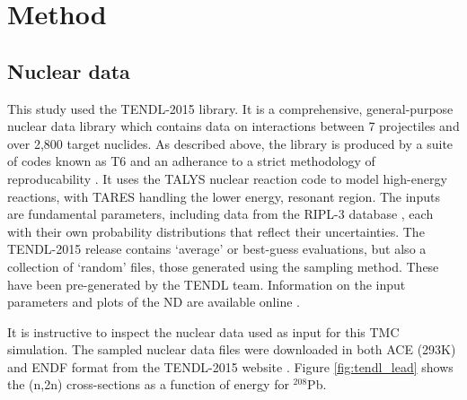 \FloatBarrier
\section{Method}

\subsection{Nuclear data}
\label{sec:data}
This study used the TENDL-2015 library. It is a comprehensive, general-purpose nuclear data library which contains data on interactions between 7 projectiles and over 2,800 target nuclides. As described above, the library is produced by a suite of codes known as T6 and an adherance to a strict methodology of reproducability \cite{Rochman2016}. It uses the TALYS nuclear reaction code to model high-energy reactions, with TARES handling the lower energy, resonant region. The inputs are fundamental parameters, including data from the RIPL-3 database \cite{RIPL3}, each with their own probability distributions that reflect their uncertainties. The TENDL-2015 release contains `average' or best-guess evaluations, but also a collection of `random' files, those generated using the sampling method. These have been pre-generated by the TENDL team. Information on the input parameters and plots of the ND are available online \cite{TENDL2015}.

It is instructive to inspect the nuclear data used as input for this TMC simulation. The sampled nuclear data files were downloaded in both ACE (293K) and ENDF format from the TENDL-2015 website \cite{TENDL2015}. Figure \ref{fig:tendl_lead} shows the (n,2n) cross-sections as a function of energy for $^{208}$Pb. 


